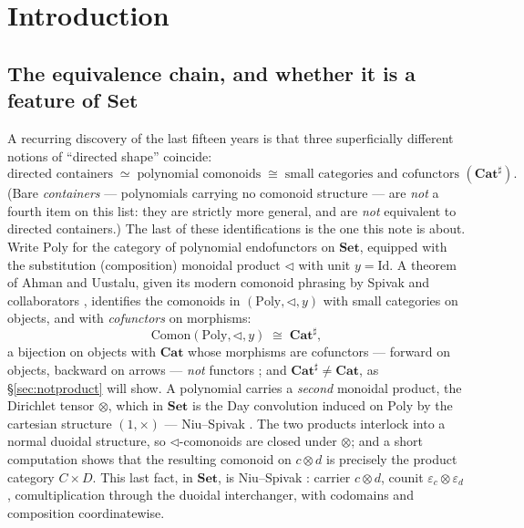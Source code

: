 \documentclass[11pt]{amsart}
\theoremstyle{plain}
\theoremstyle{definition}
\theoremstyle{remark}
\newcommand{\Set}{\mathbf{Set}}
\newcommand{\Cat}{\mathbf{Cat}}
\newcommand{\Poly}{\mathrm{Poly}}
\newcommand{\Comon}{\mathrm{Comon}}
\newcommand{\sub}{\triangleleft}      %
\begin{document}
\section{Introduction}

\subsection*{The equivalence chain, and whether it is a feature of \texorpdfstring{$\Set$}{Set}}

A recurring discovery of the last fifteen years is that three superficially different notions of
``directed shape'' coincide:
\[
   \text{directed containers} \;\simeq\; \text{polynomial comonoids} \;\cong\;
   \text{small categories and cofunctors }(\Cat^{\sharp}).
\]
(Bare \emph{containers} --- polynomials carrying no comonoid structure --- are \emph{not} a fourth
item on this list: they are strictly more general, and are \emph{not} equivalent to directed
containers.) The last of these identifications is the one this note is about. Write $\Poly$ for the
category of polynomial endofunctors on $\Set$, equipped with the substitution (composition) monoidal
product $\sub$ with unit $y=\mathrm{Id}$. A theorem of Ahman and Uustalu, given its modern comonoid
phrasing by Spivak and collaborators \cite{SGF2021,NiuSpivak2023}, identifies the comonoids in
$(\Poly,\sub,y)$ with small categories on objects, and with \emph{cofunctors} on morphisms:
\[
   \Comon(\Poly,\sub,y) \;\cong\; \Cat^{\sharp},
\]
a bijection on objects with $\Cat$ whose morphisms are cofunctors --- forward on objects, backward on
arrows --- \emph{not} functors \cite[Cor.~5.12]{ShapiroSpivak2023}; and $\Cat^{\sharp}\neq\Cat$, as
\S\ref{sec:notproduct} will show.
A polynomial carries a \emph{second} monoidal product, the Dirichlet tensor $\otimes$, which in
$\Set$ is the Day convolution induced on $\Poly$ by the cartesian structure $(1,\times)$ ---
Niu--Spivak \cite[Prop.~3.79]{NiuSpivak2023}. The two products interlock into a normal duoidal
structure, so $\sub$-comonoids are closed under $\otimes$; and a short computation shows that the
resulting comonoid on $c\otimes d$ is precisely the product category $C\times D$. This last fact, in
$\Set$, is Niu--Spivak \cite[Prop.~8.79]{NiuSpivak2023}: carrier $c\otimes d$, counit
$\varepsilon_c\otimes\varepsilon_d$, comultiplication through the duoidal interchanger, with
codomains and composition coordinatewise.
\end{document}
